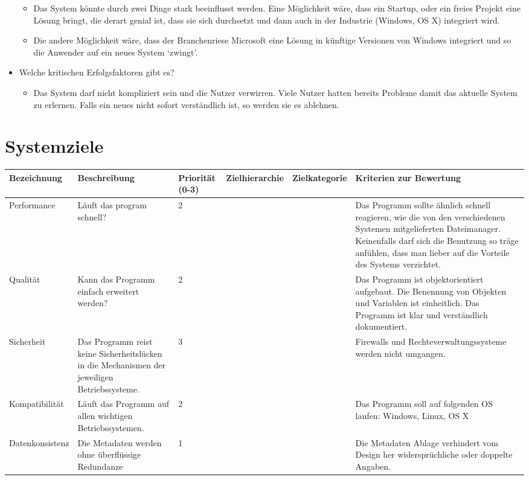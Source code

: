 \documentclass[10pt,paper=a4,final]{scrartcl}
\begin{document}
\begin{itemize}
\begin{itemize}
      \item Das System könnte durch zwei Dinge stark beeinflusst werden. Eine Möglichkeit wäre, dass ein Startup, oder ein freies Projekt eine Lösung bringt, die derart genial ist, dass sie sich durchsetzt und dann auch in der Industrie (Windows, OS X) integriert wird.
      \item Die andere Möglichkeit wäre, dass der Branchenriese Microsoft eine Lösung in künftige Versionen von Windows integriert und so die Anwender auf ein neues System ‘zwingt’.
    \end{itemize}
  \item Welche kritischen Erfolgsfaktoren gibt es?
    \begin{itemize}
      \item Das System darf nicht kompliziert sein und die Nutzer verwirren. Viele Nutzer hatten bereits Probleme damit das aktuelle System zu erlernen. Falls ein neues nicht sofort verständlich ist, so werden sie es ablehnen.
    \end{itemize}
\end{itemize}
\newpage
\section{Systemziele}
\begin{tabular}{ |l|p{2.5cm}|l|l|l|p{4.0cm}| }
  \hline
  \bf Bezeichnung & \bf Beschreibung & \bf Priorit\"at (0-3) & \bf Zielhierarchie & \bf Zielkategorie & \bf Kriterien zur Bewertung \\ \hline
  Performance & L\"auft das program schnell? & 2 & & & Das Programm sollte ähnlich schnell reagieren, wie die von den verschiedenen Systemen mitgelieferten Dateimanager.
  Keinenfalls darf sich die Benutzung so träge anfühlen, dass man lieber auf die Vorteile des Systems verzichtet. \\ \hline
  Qualit\"at & Kann das Programm einfach erweitert werden? & 2 & & & Das Programm ist objektorientiert aufgebaut.
  Die Benennung von Objekten und Variablen ist einheitlich.
  Das Programm ist klar und verständlich dokumentiert. \\ \hline
  Sicherheit & Das Programm reist keine Sicherheitslücken in die Mechanismen der jeweiligen Betriebssysteme. & 3 & & & Firewalls und Rechteverwaltungssysteme werden nicht umgangen. \\ \hline
  Kompatibilit\"at & Läuft das Programm auf allen wichtigen Betriebssystemen. & 2 & & & Das Programm soll auf folgenden OS laufen: Windows, Linux, OS X \\ \hline
  Datenkonsistenz & Die Metadaten werden ohne überflüssige Redundanze & 1 & & & Die Metadaten Ablage verhindert vom Design her widersprüchliche oder doppelte Angaben. \\ \hline
\end{tabular}
\end{document}

